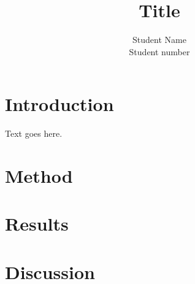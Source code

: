 \documentclass{article}
\title{Title}
\author{Student Name \\ Student number}
\begin{document}


\tableofcontents

\newpage



\section{Introduction}

Text goes here.

\section{Method}

\section{Results}

\section{Discussion}








\newpage
\nocite{VanDale}
\printbibliography



\appendix
\end{document}
